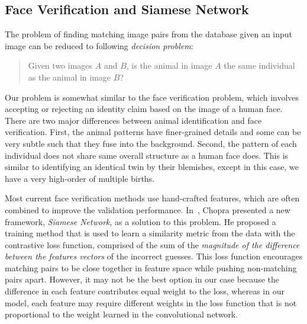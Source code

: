   \subsection{Face Verification and Siamese Network}

  The problem of finding matching image pairs from the database given an input
  image can be reduced to following \emph{decision problem}:
  \begin{quote}
  \centering
  Given two images $A$ and $B$, is the animal in image $A$ the same individual as the
  animal in image $B$?
  \end{quote}

  Our problem is somewhat similar to the face verification problem, which
  involves accepting or rejecting an identity claim based on the image of a human
  face. There are two major differences between animal identification and face
  verification. First, the animal patterns have finer-grained details and some can
  be very subtle such that they fuse into the background. Second, the pattern of each
  individual does not share same overall structure as a human face does. This is
  similar to identifying an identical twin by their blemishes, except in this
  case, we have a very high-order of multiple births.

  Most current face verification methods use hand-crafted features, which are
  often combined to improve the validation performance. In~\cite{chopra05},
  Chopra presented a new framework, \emph{Siamese Network}, as a solution to this
  problem. He proposed a training method that is used to learn a similarity
  metric from the data with the contrastive loss function, comprised of the sum
  of the \emph{magnitude of the difference between the features vectors} of the
  incorrect guesses. This loss function encourages matching pairs to be close
  together in feature space while pushing non-matching pairs apart. However, it
  may not be the best option in our case because the difference in each feature
  contributes equal weight to the loss, whereas in our model, each feature may
  require different weights in the loss function that is not proportional to the
  weight learned in the convolutional network.


